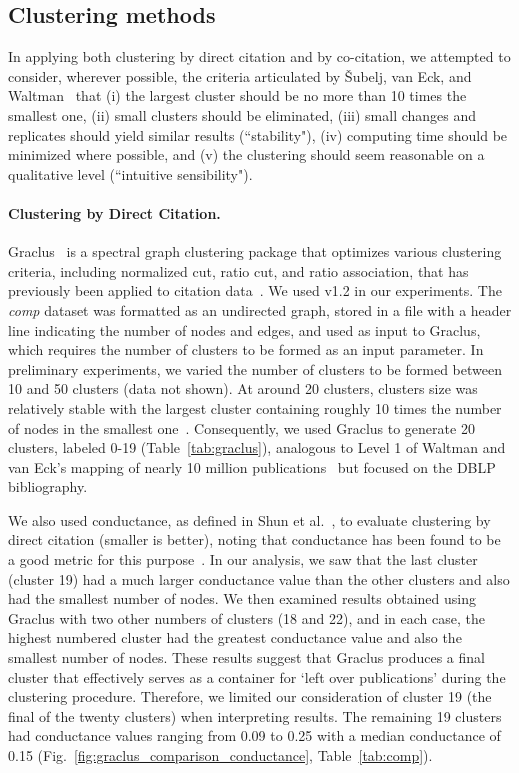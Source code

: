\subsection{Clustering methods} In applying both clustering by direct citation and by co-citation, we attempted to consider, wherever possible, the criteria articulated by \v{S}ubelj, van Eck, and Waltman~\cite{subelj_clustering_2016} that (i) the largest cluster should be no more than 10 times the smallest one, (ii) small clusters should be eliminated, (iii) small changes and replicates should yield similar results (``stability"),  (iv) computing time should be minimized where possible, and (v) the clustering should seem reasonable on a qualitative level (``intuitive sensibility").

\paragraph{Clustering by Direct Citation.} Graclus~\cite{graclus_2007} is a spectral graph clustering package that optimizes  various clustering criteria, including normalized cut, ratio cut, and ratio association, that has previously been applied to citation data~\cite{subelj_clustering_2016}. 
We used v1.2 in our experiments. The \emph{comp} dataset was formatted as an undirected graph, stored in a file with a header line indicating the number of nodes and edges, and used as input to Graclus, which requires the number of clusters to be formed as an input parameter. In preliminary experiments, we varied the number of clusters to be formed between 10 and 50 clusters (data not shown).  At around 20 clusters, clusters size was relatively stable with the largest cluster containing roughly 10 times the number of nodes in the smallest one~\cite{subelj_clustering_2016}. Consequently, we used Graclus to generate 20 clusters, labeled 0-19 (Table~\ref{tab:graclus}), analogous to Level 1 of Waltman and van Eck's mapping of nearly 10 million publications~\cite{waltman_new_2012} but focused on the DBLP bibliography.

We also used conductance, as defined in Shun et al.~\cite{shun_parallel_2016}, to  evaluate clustering by direct citation (smaller is better), noting that conductance has been found to be a good metric for this purpose~\cite{emmons2016analysis,almeida_2012}. 
In our analysis, we saw that the last cluster (cluster 19) had a much larger conductance value than the other clusters and also had the smallest
number of nodes.
We then examined
results obtained using Graclus with two other numbers of clusters (18 and 22), and
in each case, the highest numbered cluster  had the greatest conductance value and also the smallest number of nodes.
These results suggest that Graclus produces a final cluster that effectively serves as a container for `left over publications' during the clustering procedure. 
Therefore, we limited our consideration of cluster 19 (the final of the twenty clusters)  when interpreting results.  The remaining 19 clusters had conductance values ranging from 0.09 to 0.25 with a median conductance of 0.15 (Fig.~\ref{fig:graclus_comparison_conductance}, Table~\ref{tab:comp}).

